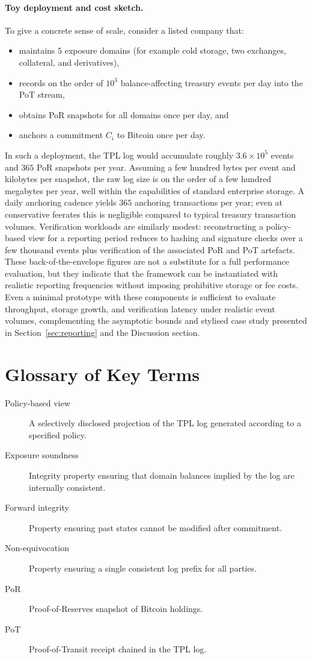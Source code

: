 \documentclass[11pt]{article}
\begin{document}
\paragraph{Toy deployment and cost sketch.}
To give a concrete sense of scale, consider a listed company that:
\begin{itemize}[noitemsep]
\item maintains $5$ exposure domains (for example cold storage, two exchanges, collateral, and derivatives),
\item records on the order of $10^3$ balance-affecting treasury events per day into the PoT stream,
\item obtains PoR snapshots for all domains once per day, and
\item anchors a commitment $C_i$ to Bitcoin once per day.
\end{itemize}
In such a deployment, the TPL log would accumulate roughly $3.6 \times 10^5$ events and $365$ PoR snapshots per year.
Assuming a few hundred bytes per event and kilobytes per snapshot, the raw log size is on the order of a few hundred
megabytes per year, well within the capabilities of standard enterprise storage.
A daily anchoring cadence yields $365$ anchoring transactions per year; even at conservative feerates this is negligible
compared to typical treasury transaction volumes.
Verification workloads are similarly modest: reconstructing a policy-based view for a reporting period reduces to hashing
and signature checks over a few thousand events plus verification of the associated PoR and PoT artefacts.
These back-of-the-envelope figures are not a substitute for a full performance evaluation, but they indicate that the
framework can be instantiated with realistic reporting frequencies without imposing prohibitive storage or fee costs.
Even a minimal prototype with these components is sufficient to evaluate throughput, storage growth, and verification
latency under realistic event volumes, complementing the asymptotic bounds and stylised case study presented in
Section~\ref{sec:reporting} and the Discussion section.

\section{Glossary of Key Terms}

\begin{description}
  \item[Policy-based view] A selectively disclosed projection of the TPL log generated according to a specified policy.
  \item[Exposure soundness] Integrity property ensuring that domain balances implied by the log are internally consistent.
  \item[Forward integrity] Property ensuring past states cannot be modified after commitment.
  \item[Non-equivocation] Property ensuring a single consistent log prefix for all parties.
  \item[PoR] Proof-of-Reserves snapshot of Bitcoin holdings.
  \item[PoT] Proof-of-Transit receipt chained in the TPL log.
\end{description}
\end{document}
